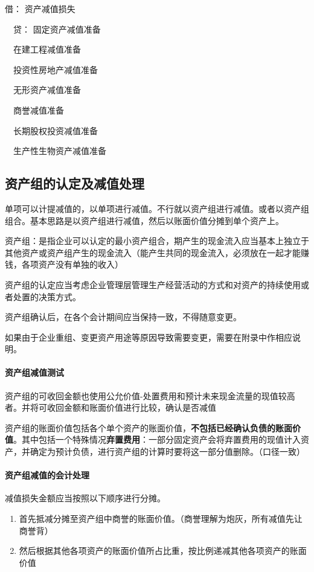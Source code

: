\documentclass[UTF8,12pt]{ctexart}
\newenvironment{Dr}{\noindent 借：}{\par}
\newenvironment{Cr}{\noindent \ \ 贷：}{\par}
\numberwithin{equation}{section} %
\numberwithin{figure}{section}
\numberwithin{table}{section}
\begin{document}
	\begin{Dr}
		资产减值损失
	\end{Dr}
	\begin{Cr}
		固定资产减值准备
		
		\ \ 在建工程减值准备
		
		\ \ 投资性房地产减值准备
		
		\ \ 无形资产减值准备
		
		\ \ 商誉减值准备
		
		\ \ 长期股权投资减值准备
		
		\ \ 生产性生物资产减值准备
	\end{Cr}
	
	
	\subsection{资产组的认定及减值处理}
	单项可以计提减值的，以单项进行减值。不行就以资产组进行减值。或者以资产组组合。基本思路是以资产组进行减值，然后以账面价值分摊到单个资产上。
	
	资产组：是指企业可以认定的最小资产组合，期产生的现金流入应当基本上独立于其他资产或资产组产生的现金流入（能产生共同的现金流入，必须放在一起才能赚钱，各项资产没有单独的收入）
	
	资产组的认定应当考虑企业管理层管理生产经营活动的方式和对资产的持续使用或者处置的决策方式。
	
	资产组确认后，在各个会计期间应当保持一致，不得随意变更。
	
	如果由于企业重组、变更资产用途等原因导致需要变更，需要在附录中作相应说明。
	
	\paragraph{资产组减值测试} 资产组的可收回金额也使用公允价值-处置费用和预计未来现金流量的现值较高者。并将可收回金额和账面价值进行比较，确认是否减值
	
	资产组的账面价值包括各个单个资产的账面价值，\textbf{不包括已经确认负债的账面价值}。其中包括一个特殊情况\textbf{弃置费用}：一部分固定资产会将弃置费用的现值计入资产，并确定为预计负债，进行资产组的计算时要将这一部分值删除。（口径一致）
	
	\paragraph{资产组减值的会计处理}
	减值损失金额应当按照以下顺序进行分摊。
	\begin{enumerate}
		\item 首先抵减分摊至资产组中商誉的账面价值。（商誉理解为炮灰，所有减值先让商誉背）
		
		\item 然后根据其他各项资产的账面价值所占比重，按比例递减其他各项资产的账面价值
	\end{enumerate}
	
\end{document}
